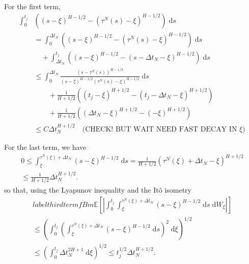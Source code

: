 \documentclass[reqno,12pt]{amsart}
\theoremstyle{plain}%
\theoremstyle{definition}
\begin{document}
For the first term,
\begin{align*}
    \int_{0}^{t_j} & \left( (s-\xi)^{H-1/2} - (\tau^N(s)-\xi)^{H-1/2}\right) \;\mathrm{d}s \\
    & = \int_{0}^{\Delta t_N} \left( (s-\xi)^{H-1/2} - (\tau^N(s)-\xi)^{H-1/2}\right) \;\mathrm{d}s \\
    & \quad + \int_{\Delta t_N}^{t_j} \left( (s-\xi)^{H-1/2} - (s - \Delta t_N -\xi)^{H-1/2}\right) \;\mathrm{d}s \\
    & \leq \int_0^{\Delta t_N}\frac{(s - \tau^N(s))^{H - 1/2}}{(s - \xi)^{H-1/2}(\tau^N(s) - \xi)^{H - 1/2}} \;\mathrm{d}s \\
    & \qquad + \frac{1}{H + 1/2} \left((t_j - \xi)^{H + 1/2} - (t_j - \Delta t_N - \xi)^{H + 1/2}\right) \\
    & \qquad + \frac{1}{H + 1/2} \left((\Delta t_N - \xi)^{H + 1/2} - (-\xi)^{H + 1/2}\right) \\
    & \leq C \Delta t_N^{H + 1/2} \quad \textrm{(CHECK! BUT WAIT NEED FAST DECAY IN $\xi$)}
\end{align*}


For the last term, we have
\begin{multline*}
    0 \leq \int_\xi^{\tau^N(\xi) + \Delta t_N} (s - \xi)^{H-1/2} \;\mathrm{d}s = \frac{1}{H + 1/2} (\tau^N(\xi) + \Delta t_N - \xi)^{H + 1/2} \\
    \leq \frac{1}{H + 1/2} \Delta t_N^{H + 1/2}.
\end{multline*}
so that, using the Lyapunov inequality and the It\^o isometry
\begin{multline}
    label{thirdtermfBm}
    \mathbb{E}\left[\left|\int_0^{t_j} \int_\xi^{\tau^N(\xi) + \Delta t_N} (s - \xi)^{H-1/2} \;\mathrm{d}s \;\mathrm{d}W_\xi\right|\right] \\
    \leq \left( \int_0^{t_j} \left(\int_\xi^{\tau^N(\xi) + \Delta t_N} (s - \xi)^{H-1/2} \;\mathrm{d}s\right)^2 \;\mathrm{d}\xi\right)^{1/2} \\ 
    \leq \left( \int_0^{t_j} \Delta t_N^{2H + 1} \;\mathrm{d}\xi\right)^{1/2} \leq t_j^{1/2} \Delta t_N^{H + 1/2}.
\end{multline}
\end{document}

